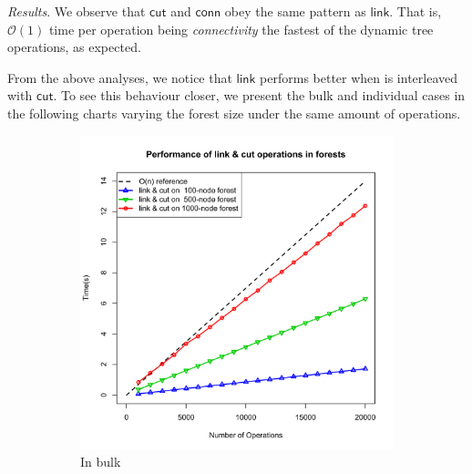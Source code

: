 \documentclass{elsarticle}
\newcommand{\MATHSF}[1]{\ensuremath{\mathsf{#1}}\xspace}
\newcommand{\link}{\MATHSF{link}}
\newcommand{\cut}{\MATHSF{cut}}
\newcommand{\conn}{\MATHSF{conn}}
\renewcommand{\O}{\ensuremath{\mathcal{O}}}
\begin{document}
\textit{\emph{Results}}. We observe that \cut and \conn obey the same pattern as \link. That is, $\O(1)$ time per operation being \textit{connectivity} the fastest of the dynamic tree operations, as expected.

From the above analyses, we notice that \link performs better when is interleaved with \cut. To see this behaviour closer, we present the bulk and individual cases in the following charts varying the forest size under the same amount of operations.

\begin{figure}[H]
\centering
\begin{subfigure}{.5\textwidth}
  \centering
  \includegraphics[scale=0.38]{./Images/plotForests}
  \caption{In bulk}
\end{subfigure}%
\begin{subfigure}{.5\textwidth}
  \centering

\end{subfigure}
\end{figure}
\end{document}
